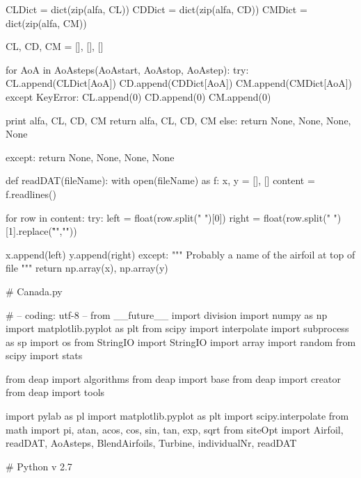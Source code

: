 \begin{pythoncode}
                    CLDict = dict(zip(alfa, CL))
                    CDDict = dict(zip(alfa, CD))
                    CMDict = dict(zip(alfa, CM))

                    CL, CD, CM = [], [], []

                    for AoA in AoAsteps(AoAstart, AoAstop, AoAstep):
                        try:
                            CL.append(CLDict[AoA])
                            CD.append(CDDict[AoA])
                            CM.append(CMDict[AoA])
                        except KeyError:
                            CL.append(0)
                            CD.append(0)
                            CM.append(0)

                    print alfa, CL, CD, CM
                    return alfa, CL, CD, CM
                else:
                    return None, None, None, None
                 
            except:
                return None, None, None, None            


def readDAT(fileName):
    with open(fileName) as f:
        x, y = [], []
        content = f.readlines()

        for row in content:
            try:
                left = float(row.split("     ")[0])
                right = float(row.split("     ")[1].replace("\r\n",""))
                
                x.append(left)
                y.append(right)
            except:
                """
                Probably a name of the airfoil at top of file
                """
        return np.array(x), np.array(y)  





# Canada.py

# -- coding: utf-8 --
from __future__ import division
import numpy as np
import matplotlib.pyplot as plt
from scipy import interpolate
import subprocess as sp
import os
from StringIO import StringIO
import array
import random
from scipy import stats

from deap import algorithms
from deap import base
from deap import creator
from deap import tools

import pylab as pl
import matplotlib.pyplot as plt
import scipy.interpolate
from math import pi, atan, acos, cos, sin, tan, exp, sqrt
from siteOpt import Airfoil, readDAT, AoAsteps, BlendAirfoils, Turbine, individualNr, readDAT

# Python v 2.7




\end{pythoncode}
